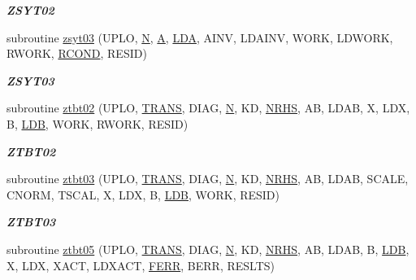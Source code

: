 \begin{DoxyCompactItemize}
\begin{DoxyCompactList}\small\item\em {\bfseries Z\+S\+Y\+T02} \end{DoxyCompactList}\item 
subroutine \hyperlink{group__complex16__lin_ga53ebf71b58cf35b308955e1ca4a82fa2}{zsyt03} (U\+P\+L\+O, \hyperlink{polmisc_8c_a0240ac851181b84ac374872dc5434ee4}{N}, \hyperlink{classA}{A}, \hyperlink{example__user_8c_ae946da542ce0db94dced19b2ecefd1aa}{L\+D\+A}, A\+I\+N\+V, L\+D\+A\+I\+N\+V, W\+O\+R\+K, L\+D\+W\+O\+R\+K, R\+W\+O\+R\+K, \hyperlink{superlu__enum__consts_8h_af00a42ecad444bbda75cde1b64bd7e72a9b5c151728d8512307565994c89919d5}{R\+C\+O\+N\+D}, R\+E\+S\+I\+D)
\begin{DoxyCompactList}\small\item\em {\bfseries Z\+S\+Y\+T03} \end{DoxyCompactList}\item 
subroutine \hyperlink{group__complex16__lin_ga8935b0b94d7aadde6c60746875593ff2}{ztbt02} (U\+P\+L\+O, \hyperlink{superlu__enum__consts_8h_a0c4e17b2d5cea33f9991ccc6a6678d62a1f61e3015bfe0f0c2c3fda4c5a0cdf58}{T\+R\+A\+N\+S}, D\+I\+A\+G, \hyperlink{polmisc_8c_a0240ac851181b84ac374872dc5434ee4}{N}, K\+D, \hyperlink{example__user_8c_aa0138da002ce2a90360df2f521eb3198}{N\+R\+H\+S}, A\+B, L\+D\+A\+B, X, L\+D\+X, B, \hyperlink{example__user_8c_a50e90a7104df172b5a89a06c47fcca04}{L\+D\+B}, W\+O\+R\+K, R\+W\+O\+R\+K, R\+E\+S\+I\+D)
\begin{DoxyCompactList}\small\item\em {\bfseries Z\+T\+B\+T02} \end{DoxyCompactList}\item 
subroutine \hyperlink{group__complex16__lin_gabd3d8f8844dcec7c5b19ae33d546ba6f}{ztbt03} (U\+P\+L\+O, \hyperlink{superlu__enum__consts_8h_a0c4e17b2d5cea33f9991ccc6a6678d62a1f61e3015bfe0f0c2c3fda4c5a0cdf58}{T\+R\+A\+N\+S}, D\+I\+A\+G, \hyperlink{polmisc_8c_a0240ac851181b84ac374872dc5434ee4}{N}, K\+D, \hyperlink{example__user_8c_aa0138da002ce2a90360df2f521eb3198}{N\+R\+H\+S}, A\+B, L\+D\+A\+B, S\+C\+A\+L\+E, C\+N\+O\+R\+M, T\+S\+C\+A\+L, X, L\+D\+X, B, \hyperlink{example__user_8c_a50e90a7104df172b5a89a06c47fcca04}{L\+D\+B}, W\+O\+R\+K, R\+E\+S\+I\+D)
\begin{DoxyCompactList}\small\item\em {\bfseries Z\+T\+B\+T03} \end{DoxyCompactList}\item 
subroutine \hyperlink{group__complex16__lin_gacc1030bfa9a1dd364c65eb6b927eadd0}{ztbt05} (U\+P\+L\+O, \hyperlink{superlu__enum__consts_8h_a0c4e17b2d5cea33f9991ccc6a6678d62a1f61e3015bfe0f0c2c3fda4c5a0cdf58}{T\+R\+A\+N\+S}, D\+I\+A\+G, \hyperlink{polmisc_8c_a0240ac851181b84ac374872dc5434ee4}{N}, K\+D, \hyperlink{example__user_8c_aa0138da002ce2a90360df2f521eb3198}{N\+R\+H\+S}, A\+B, L\+D\+A\+B, B, \hyperlink{example__user_8c_a50e90a7104df172b5a89a06c47fcca04}{L\+D\+B}, X, L\+D\+X, X\+A\+C\+T, L\+D\+X\+A\+C\+T, \hyperlink{superlu__enum__consts_8h_af00a42ecad444bbda75cde1b64bd7e72a78fd14d7abebae04095cfbe02928f153}{F\+E\+R\+R}, B\+E\+R\+R, R\+E\+S\+L\+T\+S)

\end{DoxyCompactItemize}
